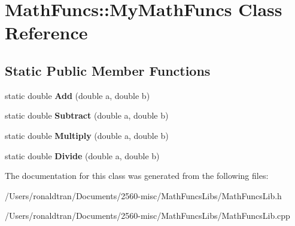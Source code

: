 \hypertarget{class_math_funcs_1_1_my_math_funcs}{}\section{Math\+Funcs\+::My\+Math\+Funcs Class Reference}
\label{class_math_funcs_1_1_my_math_funcs}
\subsection*{Static Public Member Functions}
\begin{DoxyCompactItemize}
\item 
\mbox{\label{class_math_funcs_1_1_my_math_funcs_a0840754509ebe7897a584b66e2d7c1e0}} 
static double {\bfseries Add} (double a, double b)
\item 
\mbox{\label{class_math_funcs_1_1_my_math_funcs_a3449d4adf096c39017e55fb47a906506}} 
static double {\bfseries Subtract} (double a, double b)
\item 
\mbox{\label{class_math_funcs_1_1_my_math_funcs_a5bcbd3169ade93e307d3795edb7f7940}} 
static double {\bfseries Multiply} (double a, double b)
\item 
\mbox{\label{class_math_funcs_1_1_my_math_funcs_a7e1f4f1a894572a2401a3d4114a3eb27}} 
static double {\bfseries Divide} (double a, double b)
\end{DoxyCompactItemize}


The documentation for this class was generated from the following files\+:\begin{DoxyCompactItemize}
\item 
/\+Users/ronaldtran/\+Documents/2560-\/misc/\+Math\+Funcs\+Libs/Math\+Funcs\+Lib.\+h\item 
/\+Users/ronaldtran/\+Documents/2560-\/misc/\+Math\+Funcs\+Libs/Math\+Funcs\+Lib.\+cpp\end{DoxyCompactItemize}
